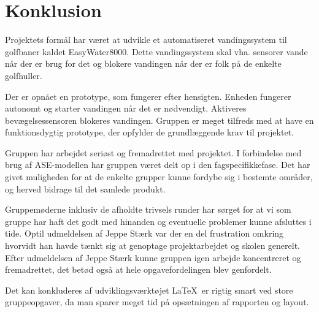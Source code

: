 
\chapter{Konklusion}

Projektets formål har været at udvikle et automatiseret vandingssystem til golfbaner kaldet EasyWater8000. Dette vandingssystem skal vha. sensorer vande når der er brug for det og blokere vandingen når der er folk på de enkelte golfhuller. 

Der er opnået en prototype, som fungerer efter hensigten. Enheden fungerer autonomt og starter vandingen når det er nødvendigt. Aktiveres bevægelsessensoren blokeres vandingen. Gruppen er meget tilfreds med at have en funktionsdygtig  prototype, der opfylder de grundlæggende krav til projektet.  

Gruppen har arbejdet seriøst og fremadrettet med projektet. I forbindelse med brug af ASE-modellen har gruppen været delt op i den fagspecifikkefase. Det har givet muligheden for at de enkelte grupper kunne fordybe sig i bestemte områder, og herved bidrage til det samlede produkt.

Gruppemøderne inklusiv de afholdte trivsels runder har sørget for at vi som gruppe har haft det godt med hinanden og eventuelle problemer kunne afsluttes i tide. Optil udmeldelsen af Jeppe Stærk var der en del frustration omkring hvorvidt han havde tænkt sig at genoptage projektarbejdet og skolen generelt. Efter udmeldelsen af Jeppe Stærk kunne gruppen igen arbejde koncentreret og fremadrettet, det betød også at hele opgavefordelingen blev genfordelt.  

Det kan konkluderes af udviklingsværktøjet \LaTeX \ er rigtig smart ved store gruppeopgaver, da man sparer meget tid på opsætningen af rapporten og layout.







